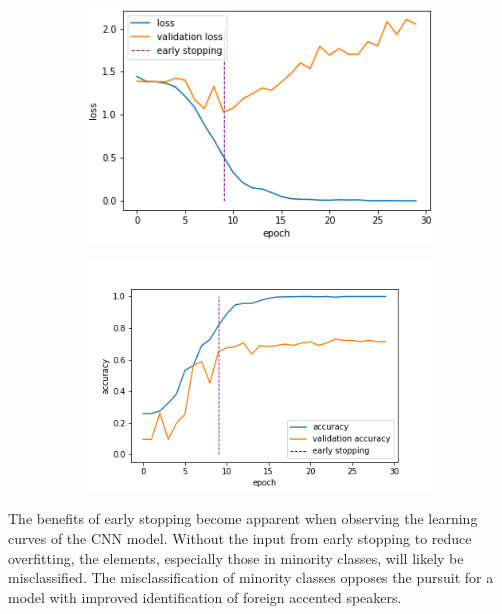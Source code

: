 \documentclass[11pt,a4paper,twoside]{article}
\begin{document}
\begin{figure}[H]
\begin{subfigure}[t]{0.237\textwidth}
  \centering
    \includegraphics[width=\textwidth]{Figures/usa_spanish_french_german_mel_hc_upsampled_loss.png}
    \label{fig:}
\end{subfigure}
\hspace{0.005\textwidth}
\begin{subfigure}[t]{0.237\textwidth}
    \centering
    \includegraphics[width=\textwidth]{Figures/usa_spanish_french_german_mel_hc_upsampled_accuracy.png}
    \label{fig:}
\end{subfigure}
\caption{}
\label{fig:}
\end{figure}

The benefits of early stopping become apparent when observing the learning curves of the CNN model. Without the input from early stopping to reduce overfitting, the elements, especially those in minority classes, will likely be misclassified. The misclassification of minority classes opposes the pursuit for a model with improved identification of foreign accented speakers.
\end{document}
